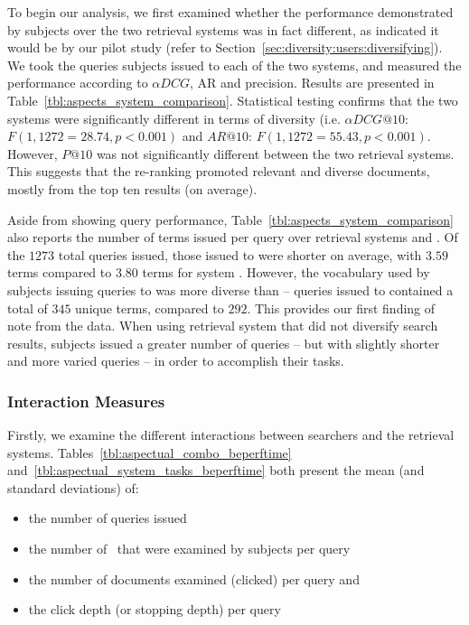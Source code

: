 To begin our analysis, we first examined whether the performance demonstrated by subjects over the two retrieval systems was in fact different, as indicated it would be by our pilot study (refer to Section~\ref{sec:diversity:users:diversifying}). We took the queries subjects issued to each of the two systems, and measured the performance according to $\alpha DCG$, AR and precision. Results are presented in Table~\ref{tbl:aspects_system_comparison}. Statistical testing confirms that the two systems were significantly different in terms of diversity (i.e. $\alpha DCG@10$: $F(1, 1272=28.74, p<0.001)$ and $AR@10$: $F(1,1272 = 55.43, p<0.001)$. However, $P@10$ was not significantly different between the two retrieval systems. This suggests that the re-ranking promoted relevant and diverse documents, mostly from the top ten results (on average).

Aside from showing query performance, Table~\ref{tbl:aspects_system_comparison} also reports the number of terms issued per query over retrieval systems  and . Of the $1273$ total queries issued, those issued to  were shorter on average, with $3.59$ terms compared to $3.80$ terms for system . However, the vocabulary used by subjects issuing queries to  was more diverse than  -- queries issued to  contained a total of $345$ unique terms, compared to $292$. This provides our first finding of note from the data. When using retrieval system  that did not diversify search results, subjects issued a greater number of queries -- but with slightly shorter and more varied queries -- in order to accomplish their tasks.

\subsubsection{Interaction Measures}
Firstly, we examine the different interactions between searchers and the retrieval systems. Tables~\ref{tbl:aspectual_combo_beperftime} and~\ref{tbl:aspectual_system_tasks_beperftime} both present the mean (and standard deviations) of:

\begin{itemize}
    \item{the number of queries issued }
    \item{the number of~ that were examined by subjects per query }
    \item{the number of documents examined (clicked) per query  and}
    \item{the click depth (or stopping depth) per query }
\end{itemize}

